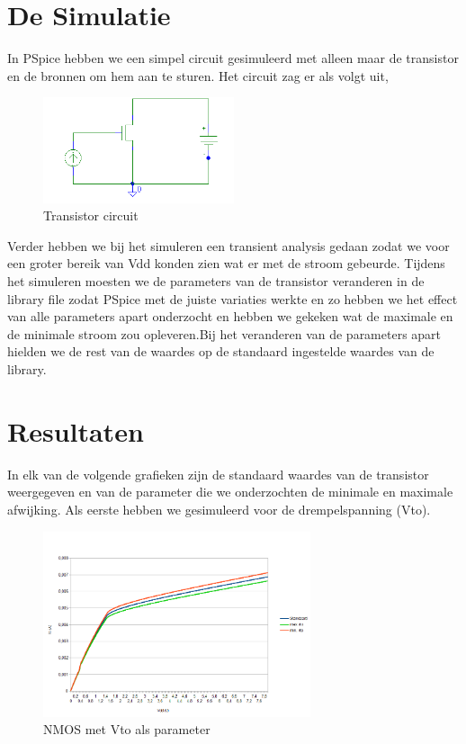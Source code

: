 \documentclass{article}
\begin{document}
\clearpage

\section{De Simulatie}
 
In PSpice hebben we een simpel circuit gesimuleerd met alleen maar de transistor en de bronnen om hem aan te sturen. Het circuit zag er als volgt uit,

\begin{figure}[H]
	\centering
	\includegraphics[width=0.5\textwidth]{transistorsim}
	\caption {Transistor circuit}
\end{figure}

Verder hebben we bij het simuleren een transient analysis gedaan zodat we voor een groter bereik van Vdd konden zien wat er met de stroom gebeurde.
Tijdens het simuleren moesten we de parameters van de transistor veranderen in de library file zodat PSpice met de juiste variaties werkte en zo hebben we het effect van alle parameters apart onderzocht en hebben we gekeken wat de maximale en de minimale stroom zou opleveren.Bij het veranderen van de parameters apart hielden we de rest van de waardes op de standaard ingestelde waardes van de library.

\clearpage

\section{Resultaten}

In elk van de volgende grafieken zijn de standaard waardes van de transistor weergegeven en van de parameter die we onderzochten de minimale en maximale afwijking.
Als eerste hebben we gesimuleerd voor de drempelspanning (Vto).

\begin{figure}[H]
	\centering
	\includegraphics[width=0.7\textwidth]{nmosvto}
	\caption{NMOS met Vto als parameter}
\end{figure}
\end{document}
